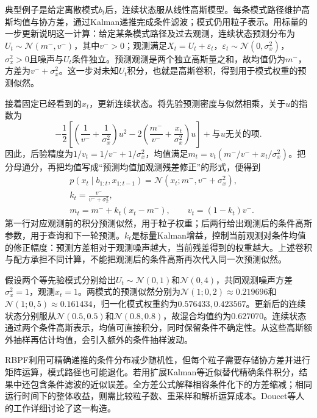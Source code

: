 典型例子是给定离散模式$b_t$后，连续状态服从线性高斯模型。每条模式路径维护高斯均值与协方差，通过Kalman递推完成条件滤波；模式仍用粒子表示。用标量的一步更新说明这一计算：给定某条模式路径及过去观测，连续状态预测分布为$U_t\sim\mathcal{N}(m^-,v^-)$，其中$v^->0$；观测满足$X_t=U_t+\varepsilon_t$，$\varepsilon_t\sim\mathcal{N}(0,\sigma_x^2)$，$\sigma_x^2>0$且噪声与$U_t$条件独立。预测观测是两个独立高斯量之和，故均值仍为$m^-$，方差为$v^-+\sigma_x^2$。这一步对未知$U_t$积分，也就是高斯卷积，得到用于模式权重的预测似然。

接着固定已经看到的$x_t$，更新连续状态。将先验预测密度与似然相乘，关于$u$的指数为
\[
  -\frac12\left[
       \left(\frac1{v^-}+\frac1{\sigma_x^2}\right)u^2
       -2\left(\frac{m^-}{v^-}+\frac{x_t}{\sigma_x^2}\right)u
       \right]+\text{与$u$无关的项}.
\]
因此，后验精度为$1/v_t=1/v^-+1/\sigma_x^2$，均值满足$m_t=v_t(m^-/v^-+x_t/\sigma_x^2)$。把分母通分，再把均值写成“预测均值加观测残差修正”的形式，便得到
\begin{equation}
  \begin{aligned}
    &p(x_t\mid b_{1:t},x_{1:t-1})
       =\mathcal{N}(x_t;m^-,v^-+\sigma_x^2),\\
    &k_t=\frac{v^-}{v^-+\sigma_x^2},\\
    &m_t=m^-+k_t(x_t-m^-),\qquad v_t=(1-k_t)v^-.
  \end{aligned}
  \label{eq:pgm-sampling-rbpf-gaussian}
\end{equation}
第一行对应观测前的积分预测似然，用于粒子权重；后两行给出观测后的条件高斯参数，用于查询和下一轮预测。$k_t$是标量Kalman增益，控制当前观测对条件均值的修正幅度：预测方差相对于观测噪声越大，当前残差得到的权重越大。上述卷积与配方承担不同计算，不能把观测后的条件高斯再次代入同一次预测似然。

假设两个等先验模式分别给出$U_t\sim\mathcal{N}(0,1)$和$\mathcal{N}(0,4)$，共同观测噪声方差$\sigma_x^2=1$，观测$x_t=1$。两模式的预测似然分别为$\mathcal{N}(1;0,2)\approx0.219696$和$\mathcal{N}(1;0,5)\approx0.161434$，归一化模式权重约为$0.576433,0.423567$。更新后的连续状态分别服从$\mathcal{N}(0.5,0.5)$和$\mathcal{N}(0.8,0.8)$，故混合均值约为$0.627070$。连续状态通过两个条件高斯表示，均值可直接积分，同时保留条件不确定性。从这些高斯额外抽样再估计均值，会引入额外的条件抽样波动。

RBPF利用可精确递推的条件分布减少随机性，但每个粒子需要存储协方差并进行矩阵运算，模式路径也可能退化。若用扩展Kalman等近似替代精确条件积分，结果中还包含条件滤波的近似误差。全方差公式解释相容条件化下的方差缩减；相同运行时间下的整体收益，则需比较粒子数、重采样和解析运算成本。Doucet等人的工作详细讨论了这一构造。

